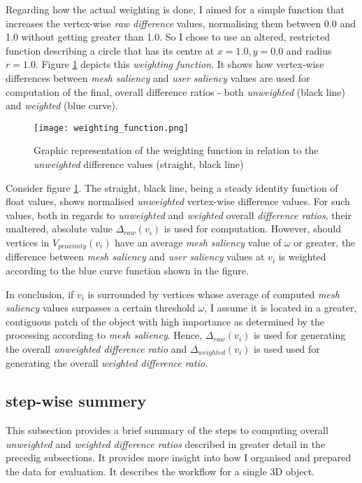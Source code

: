 Regarding how the actual weighting is done, I aimed for a simple function that increases the vertex-wise \textit{raw difference} values, normalising them between 0.0 and 1.0 without getting greater than 1.0. So I chose to use an altered, restricted function describing a circle that has its centre at $x = 1.0, y = 0.0$ and radius $r = 1.0$. Figure \ref{fig:weighting_function} depicts this \textit{weighting function}. It shows how vertex-wise differences between \textit{mesh saliency} and \textit{user saliency} values are used for computation of the final, overall difference ratios - both \textit{unweighted} (black line) and \textit{weighted} (blue curve).

\begin{figure}[htb]
  \centering
  \texttt{[image: weighting\_function.png]}\\ %
  \caption{Graphic representation of the weighting function in relation to the \textit{unweighted} difference values (straight, black line)}\label{fig:weighting_function}
\end{figure}

Consider figure \ref{fig:weighting_function}. The straight, black line, being a steady identity function of float values, shows normalised \textit{unweighted} vertex-wise difference values. For such values, both in regards to \textit{unweighted} and \textit{weighted} overall \textit{difference ratios}, their unaltered, absolute value $\Delta_{raw}(v_i)$ is used for computation. However, should vertices in $V_{proximty}(v_i)$ have an average \textit{mesh saliency} value of $\omega$ or greater, the difference between \textit{mesh saliency} and \textit{user saliency} values at $v_i$ is weighted according to the blue curve function shown in the figure.

In conclusion, if $v_i$ is surrounded by vertices whose average of computed \textit{mesh saliency} values surpasses a certain threshold $\omega$, I assume it is located in a greater, contiguous patch of the object with high importance as determined by the processing according to \textit{mesh saliency}. Hence, $\Delta_{raw}(v_i)$ is used for generating the overall \textit{unweighted difference ratio} and $\Delta_{weighted}(v_i)$ is used used for generating the overall \textit{weighted difference ratio}.

		\subsection{step-wise summery}
		\label{sec:ste_wise_summery}
This subsection provides a brief summary of the steps to computing overall \textit{unweighted} and \textit{weighted difference ratios} described in greater detail in the precedig subsections. It provides more insight into how I organised and prepared the data for evaluation. It describes the workflow for a single 3D object.

